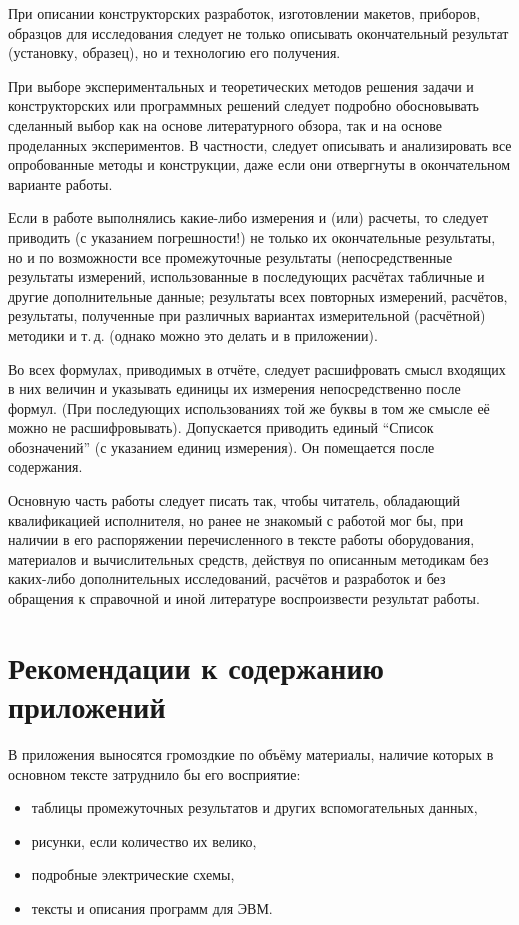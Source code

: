 \documentclass[utf8,12pt, coursreport]{G7-32}
\begin{document}
При описании конструкторских разработок, изготовлении макетов, приборов, образцов для исследования следует не только описывать окончательный результат (установку, образец), но и технологию его получения.

При выборе экспериментальных и теоретических методов решения задачи и конструкторских или программных решений следует подробно обосновывать сделанный выбор как на основе литературного обзора, так и на основе проделанных экспериментов. В частности, следует описывать и анализировать все опробованные методы и конструкции, даже если они отвергнуты в окончательном варианте работы.

Если в работе выполнялись какие-либо измерения и (или) расчеты, то следует приводить (с указанием погрешности!) не только их окончательные результаты, но и по возможности все промежуточные результаты (непосредственные результаты измерений, использованные в последующих расчётах табличные и другие дополнительные данные; результаты всех повторных измерений, расчётов, результаты, полученные при различных вариантах измерительной (расчётной) методики и т.\,д. (однако можно это делать и в приложении).

Во всех формулах, приводимых в отчёте, следует расшифровать смысл входящих в них величин и указывать единицы их измерения непосредственно после формул. (При последующих использованиях той же буквы в том же смысле её можно не расшифровывать). Допускается приводить единый ``Список обозначений'' (с указанием единиц измерения). Он помещается после содержания.

Основную часть работы следует писать так, чтобы читатель, обладающий квалификацией исполнителя, но ранее не знакомый с работой мог бы, при наличии в его распоряжении перечисленного в тексте работы оборудования, материалов и вычислительных средств, действуя по описанным методикам без каких-либо дополнительных исследований, расчётов и разработок и без обращения к справочной и иной литературе воспроизвести результат работы.

\section{Рекомендации к содержанию приложений}

В приложения выносятся громоздкие по объёму материалы, наличие которых в основном тексте затруднило бы его восприятие:
\begin{itemize}
\item таблицы промежуточных результатов и других вспомогательных данных,
\item рисунки, если количество их велико,
\item подробные электрические схемы,
\item тексты и описания программ для ЭВМ.
\end{itemize}
\end{document}
